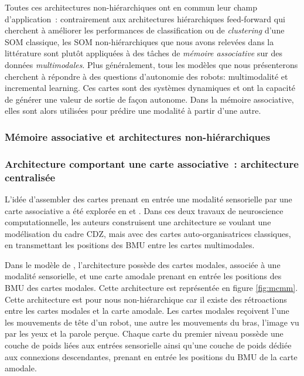 \documentclass[../main]{subfiles}
\begin{document}
Toutes ces architectures non-hiérarchiques ont en commun leur champ d'application~: contrairement aux architectures hiérarchiques feed-forward qui cherchent à améliorer les performances de classification ou de \emph{clustering} d'une SOM classique, les SOM non-hiérarchiques que nous avons relevées dans la littérature sont plutôt appliquées à des tâches de \emph{mémoire associative} sur des données \emph{multimodales}. 
Plus généralement, tous les modèles que nous présenterons cherchent à répondre à des questions d'autonomie des robots: multimodalité et incremental learning. 
Ces cartes sont des systèmes dynamiques et ont la capacité de générer une valeur de sortie de façon autonome. Dans la mémoire associative, elles sont alors utilisées pour prédire une modalité à partir d'une autre.


\subsubsection{Mémoire associative et architectures non-hiérarchiques}


\subsubsection{Architecture comportant une carte associative~: architecture centralisée}

L'idée d'assembler des cartes prenant en entrée une modalité sensorielle par une carte associative a été explorée en \cite{dominey13} et \cite{escobar-juarez_self-organized_2016}.
Dans ces deux travaux de neuroscience computationnelle, les auteurs construisent une architecture se voulant une modélisation du cadre CDZ, mais avec des cartes auto-organisatrices classiques, en transmettant les positions des BMU entre les cartes multimodales. 

Dans le modèle de \cite{dominey13}, l'architecture possède des cartes modales, associée à une modalité sensorielle, et une carte amodale prenant en entrée les positions des BMU des cartes modales. Cette architecture est représentée en figure \ref{fig:mcmm}. Cette architecture est pour nous non-hiérarchique car il existe des rétroactions entre les cartes modales et la carte amodale.
Les cartes modales reçoivent l'une les mouvements de tête d'un robot, une autre les mouvements du bras, l'image vu par les yeux et la parole perçue.
Chaque carte du premier niveau possède une couche de poids liées aux entrées sensorielle ainsi qu'une couche de poids dédiée aux connexions descendantes, prenant en entrée les positions du BMU de la carte amodale.
\end{document}
